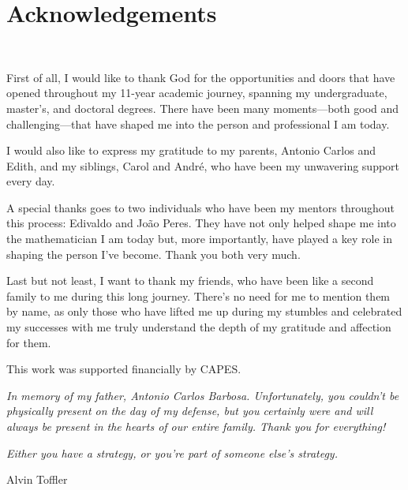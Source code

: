 \documentclass[12pt,oneside]{book}
\begin{document}
    \newpage
    \chapter*{Acknowledgements}
    \thispagestyle{empty}
    \

    First of all, I would like to thank God for the opportunities and doors that have opened throughout 
    my 11-year academic journey, spanning my undergraduate, master’s, and doctoral degrees. There have 
    been many moments—both good and challenging—that have shaped me into the person and professional I 
    am today.

    I would also like to express my gratitude to my parents, Antonio Carlos and Edith, and my siblings, 
    Carol and André, who have been my unwavering support every day.

    A special thanks goes to two individuals who have been my mentors throughout this process: Edivaldo 
    and João Peres. They have not only helped shape me into the mathematician I am today but, more 
    importantly, have played a key role in shaping the person I’ve become. Thank you both very much.

    Last but not least, I want to thank my friends, who have been like a second family to me during this 
    long journey. There’s no need for me to mention them by name, as only those who have lifted me up 
    during my stumbles and celebrated my successes with me truly understand the depth of my gratitude 
    and affection for them.

    This work was supported financially by CAPES.



    \vspace{2cm}

    \begin{center}
        \begin{minipage}{10cm}
            \textit{In memory of my father, Antonio Carlos Barbosa. Unfortunately, you couldn't be 
            physically present on the day of my defense, but you certainly were and will always be 
            present in the hearts of our entire family. Thank you for everything!}
        \end{minipage}
    \end{center}



    \newpage
    \thispagestyle{empty}

    \begin{flushright}
        \begin{minipage}{7cm}
            \begin{flushright}
                \vspace{22cm}\textit{Either you have a strategy, or you're part of someone else's 
                strategy.}

                \vspace{0.2cm} Alvin Toffler
            \end{flushright}
        \end{minipage}
    \end{flushright}
\end{document}
